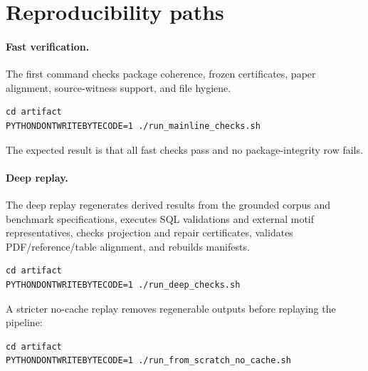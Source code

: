 \documentclass[10pt]{article}
\begin{document}
\section*{Reproducibility paths}
\paragraph{Fast verification.}
The first command checks package coherence, frozen certificates, paper alignment, source-witness support, and file hygiene.
\begin{verbatim}
cd artifact
PYTHONDONTWRITEBYTECODE=1 ./run_mainline_checks.sh
\end{verbatim}
The expected result is that all fast checks pass and no package-integrity row fails.

\paragraph{Deep replay.}
The deep replay regenerates derived results from the grounded corpus and benchmark specifications, executes SQL validations and external motif representatives, checks projection and repair certificates, validates PDF/reference/table alignment, and rebuilds manifests.
\begin{verbatim}
cd artifact
PYTHONDONTWRITEBYTECODE=1 ./run_deep_checks.sh
\end{verbatim}
A stricter no-cache replay removes regenerable outputs before replaying the pipeline:
\begin{verbatim}
cd artifact
PYTHONDONTWRITEBYTECODE=1 ./run_from_scratch_no_cache.sh
\end{verbatim}
\end{document}
